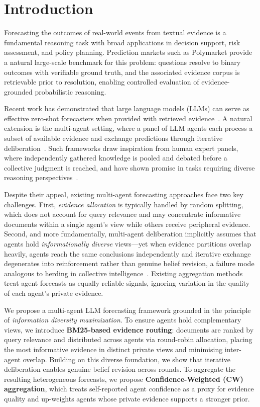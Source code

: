 \documentclass[11pt]{article}
\theoremstyle{definition}          %
\begin{document}
\section{Introduction}
\label{sec:intro}

Forecasting the outcomes of real-world events from textual evidence is a fundamental reasoning task with broad applications in decision support, risk assessment, and policy planning.
Prediction markets such as Polymarket provide a natural large-scale benchmark for this problem: questions resolve to binary outcomes with verifiable ground truth, and the associated evidence corpus is retrievable prior to resolution, enabling
controlled evaluation of evidence-grounded probabilistic reasoning.

Recent work has demonstrated that large language models (LLMs) can serve as effective zero-shot forecasters when provided with retrieved evidence~\citep{}.
A natural extension is the multi-agent setting, where a panel of LLM agents each
process a subset of available evidence and exchange predictions through iterative deliberation~\citep{}.
Such frameworks draw inspiration from human expert panels, where independently gathered knowledge is pooled and debated before a collective judgment is reached, and have shown promise in tasks requiring diverse reasoning perspectives~\citep{}.


Despite their appeal, existing multi-agent forecasting approaches face two key challenges.
First, \emph{evidence allocation} is typically handled by random splitting, which does not account for query relevance and may concentrate informative documents within a single agent's view while others receive peripheral evidence.
Second, and more fundamentally, multi-agent deliberation implicitly assumes that agents hold \emph{informationally diverse} views---yet when evidence partitions
overlap heavily, agents reach the same conclusions independently and iterative exchange degenerates into reinforcement rather than genuine belief revision, a failure mode analogous to herding in collective intelligence~\citep{}.
Existing aggregation methods treat agent forecasts as equally reliable signals, ignoring variation in the quality of each agent's private evidence.


We propose a multi-agent LLM forecasting framework grounded in the principle of \emph{information diversity maximization}.
To ensure agents hold complementary views, we introduce \textbf{BM25-based evidence routing}: documents are ranked by query relevance and distributed across agents via round-robin allocation, placing the most informative evidence in distinct private views and minimising inter-agent overlap.
Building on this diverse foundation, we show that iterative deliberation enables genuine belief revision across rounds.
To aggregate the resulting heterogeneous forecasts, we propose \textbf{Confidence-Weighted (CW) aggregation}, which treats self-reported agent confidence as a proxy for evidence quality and up-weights agents whose private evidence supports a stronger prior.
\end{document}
